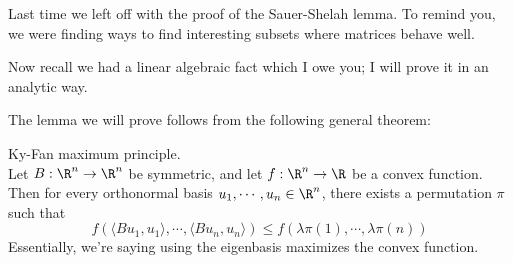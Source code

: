 
Last time we left off with the proof of the Sauer-Shelah lemma. To remind you, we were finding ways to find interesting subsets where matrices behave well. 

Now recall we had a linear algebraic fact which I owe you; I will prove it in an analytic way.

The lemma we will prove follows from the following general theorem: 
\begin{thm} Ky-Fan maximum principle. \\
Let $B: \R^n \to \R^n$ be symmetric, and let $f: \R^n \to \R$ be a convex function. Then for every orthonormal basis $u_1, \cdots, u_n \in \R^n$, there exists a permutation $\pi$ such that 
\[
f(\langle Bu_1, u_1 \rangle, \cdots, \langle Bu_n, u_n \rangle) \leq f(\lambda\pi(1), \cdots, \lambda\pi(n))
\]
Essentially, we're saying using the eigenbasis maximizes the convex function. 
\end{thm}
